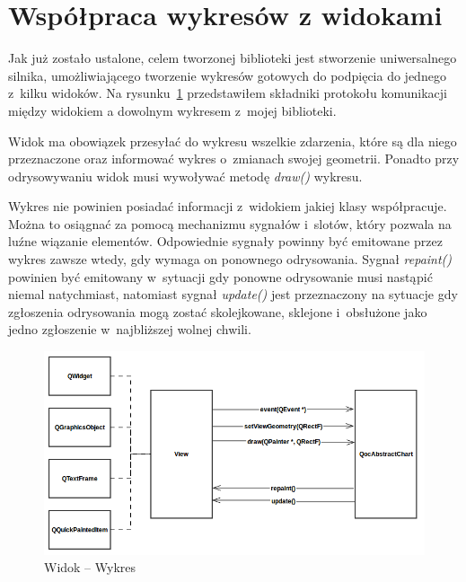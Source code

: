 \section{Współpraca wykresów z widokami }
Jak już zostało ustalone, celem tworzonej biblioteki jest stworzenie uniwersalnego silnika, umożliwiającego tworzenie wykresów gotowych do podpięcia do jednego z~kilku widoków. Na rysunku~\ref{rys:widok:wykres} przedstawiłem składniki protokołu komunikacji między widokiem a dowolnym wykresem z~mojej biblioteki.

Widok ma obowiązek przesyłać do wykresu wszelkie zdarzenia, które są dla niego przeznaczone oraz informować wykres o~zmianach swojej geometrii. Ponadto przy odrysowywaniu widok musi wywoływać metodę \textit{draw()} wykresu.

Wykres nie powinien posiadać informacji z~widokiem jakiej klasy współpracuje. Można to osiągnać za pomocą mechanizmu sygnałów i~slotów, który pozwala na luźne wiązanie elementów. Odpowiednie sygnały  powinny być emitowane przez wykres zawsze wtedy, gdy wymaga on ponownego odrysowania.
Sygnał \textit{repaint()} powinien być emitowany w~sytuacji gdy ponowne odrysowanie musi nastąpić niemal natychmiast, natomiast sygnał \textit{update()} jest przeznaczony na sytuacje gdy zgłoszenia odrysowania mogą zostać skolejkowane, sklejone i~obsłużone jako jedno zgłoszenie w~najbliższej wolnej chwili.


\begin{figure}
\centering
\caption{Widok -- Wykres}\label{rys:widok:wykres}
\includegraphics[scale=0.8]{img/widok-wykres.png}
\end{figure}


